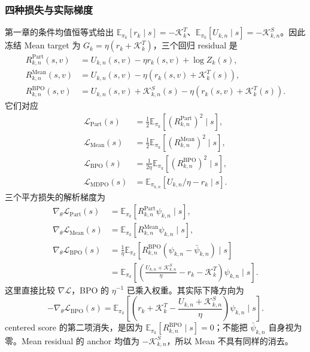 \subsubsection*{四种损失与实际梯度}
第一章的条件均值恒等式给出 $\mathbb E_{\pi_k}[r_k\mid s]=-\mathcal K_k^{T}$、$\mathbb E_{\pi_k}[U_{k,n}\mid s]=-\mathcal K_{k,n}^{S}$。因此冻结 Mean target 为 $G_k=\eta(r_k+\mathcal K_k^{T})$，三个回归 residual 是
\begin{align}
R_{k,n}^{\mathrm{Part}}(s,v)&=U_{k,n}(s,v)-\eta r_k(s,v)+\log Z_k(s),
\label{eq:ch2-opd-full-part-simplified}\\
R_{k,n}^{\mathrm{Mean}}(s,v)&=U_{k,n}(s,v)-\eta(r_k(s,v)+\mathcal K_k^{T}(s)),
\label{eq:ch2-opd-full-mean-simplified}\\
R_{k,n}^{\mathrm{BPO}}(s,v)&=U_{k,n}(s,v)+\mathcal K_{k,n}^{S}(s)-\eta(r_k(s,v)+\mathcal K_k^{T}(s)).
\label{eq:ch2-opd-full-bpo-residual}
\end{align}
它们对应
\begin{align}
\mathcal L_{\mathrm{Part}}(s)&=\tfrac12\mathbb E_{\pi_k}[(R_{k,n}^{\mathrm{Part}})^2\mid s],\\
\mathcal L_{\mathrm{Mean}}(s)&=\tfrac12\mathbb E_{\pi_k}[(R_{k,n}^{\mathrm{Mean}})^2\mid s],\\
\mathcal L_{\mathrm{BPO}}(s)&=\tfrac1{2\eta}\mathbb E_{\pi_k}[(R_{k,n}^{\mathrm{BPO}})^2\mid s],
\label{eq:ch2-opd-full-bpo-simplified}\\
\mathcal L_{\mathrm{MDPO}}(s)&=\mathbb E_{\pi_{k,n}}[U_{k,n}/\eta-r_k\mid s].
\label{eq:ch2-opd-full-mdpo-simplified}
\end{align}
三个平方损失的解析梯度为
\begin{align}
\nabla_\theta\mathcal L_{\mathrm{Part}}(s)&=\mathbb E_{\pi_k}[R_{k,n}^{\mathrm{Part}}\psi_{k,n}\mid s],\\
\nabla_\theta\mathcal L_{\mathrm{Mean}}(s)&=\mathbb E_{\pi_k}[R_{k,n}^{\mathrm{Mean}}\psi_{k,n}\mid s],\\
\nabla_\theta\mathcal L_{\mathrm{BPO}}(s)&=\frac1\eta\mathbb E_{\pi_k}[R_{k,n}^{\mathrm{BPO}}(\psi_{k,n}-\bar\psi_{k,n})\mid s]\\
&=\mathbb E_{\pi_k}\left[\left(\frac{U_{k,n}+\mathcal K_{k,n}^{S}}\eta-r_k-\mathcal K_k^{T}\right)\psi_{k,n}\mid s\right].
\label{eq:ch2-opd-full-bpo-gradient-simplified}
\end{align}
这里直接比较 $\nabla\mathcal L$，BPO 的 $\eta^{-1}$ 已乘入权重。其实际下降方向为
\begin{equation}
-\nabla_\theta\mathcal L_{\mathrm{BPO}}(s)
=\mathbb E_{\pi_k}\left[\left(r_k+\mathcal K_k^{T}-\frac{U_{k,n}+\mathcal K_{k,n}^{S}}\eta\right)\psi_{k,n}\mid s\right].
\label{eq:ch2-opd-bpo-descent-expanded}
\end{equation}
centered score 的第二项消失，是因为 $\mathbb E_{\pi_k}[R_{k,n}^{\mathrm{BPO}}\mid s]=0$；不能把 $\bar\psi_{k,n}$ 自身视为零。Mean residual 的 anchor 均值为 $-\mathcal K_{k,n}^{S}$，所以 Mean 不具有同样的消去。

